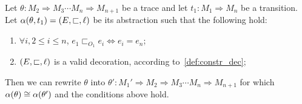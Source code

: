\begin{lemma}
  Let $\theta:M_2\Rightarrow M_3\cdots M_n\Rightarrow M_{n+1}$ be a trace and let $t_1:M_1\Rightarrow M_n$ be a transition. Let $\alpha(\theta,t_1) = (E,\sqsubset,\ell)$ be its abstraction such that the following hold:
  \begin{enumerate}
  \item $\forall i, 2\leq i\leq n$, $e_1\sqsubset_{O_1} e_i\iff e_i = e_n$;
  \item $(E,\sqsubset,\ell)$ is a valid decoration, according to~\autoref{def:constr_dec};
  \end{enumerate}
Then we can rewrite $\theta$ into $\theta':M_1'\Rightarrow M_2\Rightarrow M_3\cdots M_n\Rightarrow M_{n+1}$ for which $\alpha(\theta)\cong\alpha(\theta')$ and the conditions above hold.
\end{lemma}
